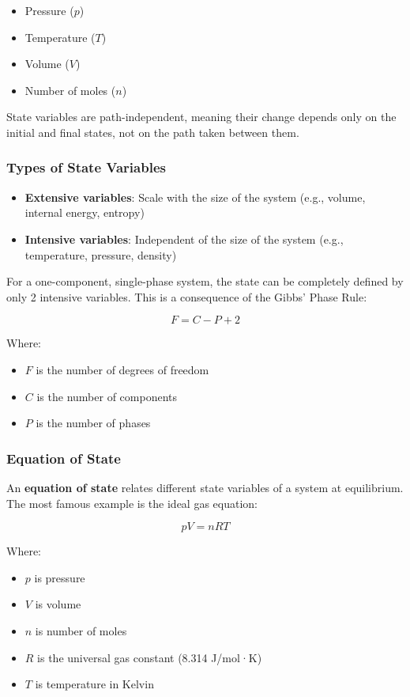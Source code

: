 \documentclass{article}
\theoremstyle{definition}
\begin{document}
\begin{itemize}
    \item Pressure ($p$)
    \item Temperature ($T$)
    \item Volume ($V$)
    \item Number of moles ($n$)
\end{itemize}

State variables are path-independent, meaning their change depends only on the initial and final states, not on the path taken between them.

\subsubsection{Types of State Variables}
\begin{itemize}
    \item \textbf{Extensive variables}: Scale with the size of the system (e.g., volume, internal energy, entropy)
    \item \textbf{Intensive variables}: Independent of the size of the system (e.g., temperature, pressure, density)
\end{itemize}

For a one-component, single-phase system, the state can be completely defined by only 2 intensive variables. This is a consequence of the Gibbs' Phase Rule:

\[
F = C - P + 2
\]

Where:
\begin{itemize}
    \item $F$ is the number of degrees of freedom
    \item $C$ is the number of components
    \item $P$ is the number of phases
\end{itemize}

\subsubsection{Equation of State}
An \textbf{equation of state} relates different state variables of a system at equilibrium. The most famous example is the ideal gas equation:

\[
pV = nRT
\]

Where:
\begin{itemize}
    \item $p$ is pressure
    \item $V$ is volume
    \item $n$ is number of moles
    \item $R$ is the universal gas constant (8.314 J/mol·K)
    \item $T$ is temperature in Kelvin
\end{itemize}
\end{document}
